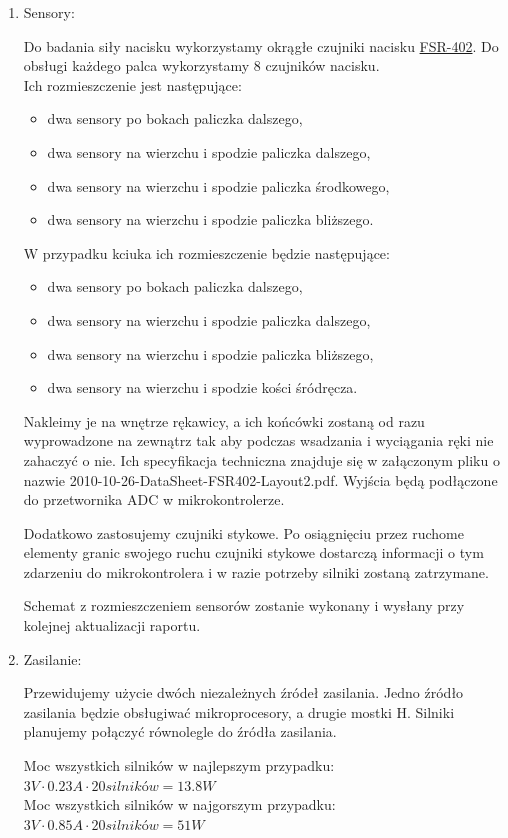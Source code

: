 \documentclass[a4paper]{article}
\begin{document}
\begin{enumerate}
\item Sensory:

Do badania siły nacisku wykorzystamy okrągłe czujniki nacisku
\href{http://www.trossenrobotics.com/productdocs/2010-10-26-DataSheet-FSR402-Layout2.pdf}{FSR-402}.
Do obsługi każdego palca wykorzystamy 8 czujników nacisku.\\
Ich rozmieszczenie jest następujące:
\begin{itemize}
\item dwa sensory po bokach paliczka dalszego,
\item dwa sensory na wierzchu i spodzie paliczka dalszego,
\item dwa sensory na wierzchu i spodzie paliczka środkowego,
\item dwa sensory na wierzchu i spodzie paliczka bliższego.
\end{itemize}
W przypadku kciuka ich rozmieszczenie będzie następujące:
\begin{itemize}
\item dwa sensory po bokach paliczka dalszego,
\item dwa sensory na wierzchu i spodzie paliczka dalszego,
\item dwa sensory na wierzchu i spodzie paliczka bliższego,
\item dwa sensory na wierzchu i spodzie kości śródręcza.
\end{itemize}
Nakleimy je na wnętrze rękawicy, a ich końcówki zostaną od razu wyprowadzone na zewnątrz tak aby podczas wsadzania i wyciągania ręki nie zahaczyć o nie. Ich specyfikacja techniczna znajduje się w załączonym pliku o nazwie 2010-10-26-DataSheet-FSR402-Layout2.pdf. Wyjścia będą podłączone do przetwornika ADC w mikrokontrolerze.

Dodatkowo zastosujemy czujniki stykowe. Po osiągnięciu przez ruchome elementy granic swojego ruchu czujniki stykowe dostarczą informacji o tym zdarzeniu do mikrokontrolera i w razie potrzeby silniki zostaną zatrzymane.

Schemat z rozmieszczeniem sensorów zostanie wykonany i wysłany przy kolejnej aktualizacji raportu.

\item Zasilanie:

Przewidujemy użycie dwóch niezależnych źródeł zasilania. Jedno źródło zasilania będzie obsługiwać mikroprocesory, a drugie mostki H.
Silniki planujemy połączyć równolegle do źródła zasilania.

Moc wszystkich silników w najlepszym przypadku: \\
\begin{math}
3V \cdot 0.23A \cdot 20 silników = 13.8W
\end{math} \\
Moc wszystkich silników w najgorszym przypadku: \\
\begin{math}
3V \cdot 0.85A \cdot 20 silników = 51W
\end{math}


\end{enumerate}
\end{document}
